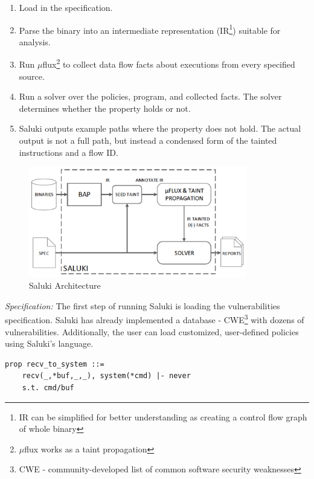\documentclass[a4paper, 12pt, journal, onecolumn]{IEEEtran}
\begin{document}
\begin{enumerate}[label=\Alph*]
\item Load in the specification.
\item Parse the binary into an intermediate representation (IR\footnote{IR can be simplified for better understanding as creating a control flow graph of whole binary}) suitable for analysis. 
\item Run $\mu$flux\footnote{$\mu$flux works as a taint propagation} to collect data flow facts about executions from every specified source.
\item Run a solver over the policies, program, and collected facts. The solver determines whether the property holds or not.
\item Saluki outputs example paths where the property does not hold. The actual output is not a full path, but instead a condensed form of the tainted instructions and a flow ID.
\end{enumerate}

\begin{figure}[ht]
    \centering
    \captionsetup{justification=centering}
    \includegraphics[width=0.85\textwidth]{saluki.png}
    \caption{Saluki Architecture \cite{saluki}}
    \label{fig:saluki}
\end{figure}

\textit{Specification: } The first step of running Saluki is loading the vulnerabilities specification. Saluki has already implemented a database - CWE\footnote{CWE - community-developed list of common software security weaknesses} with dozens of vulnerabilities. Additionally, the user can load customized, user-defined policies using Saluki's language.\\


\begin{lstlisting}[label=saluki-code,caption=Command injection example]
    prop recv_to_system ::=
    recv(_,*buf,_,_), system(*cmd) |- never
    s.t. cmd/buf
\end{lstlisting}
\end{document}
